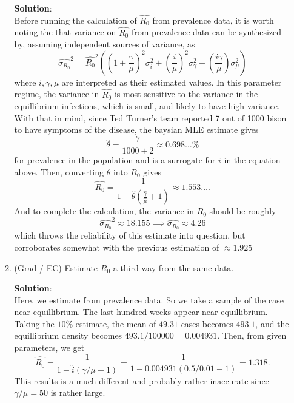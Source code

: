 \documentclass[11pt]{article}
\begin{document}
\begin{enumerate}
\begin{enumerate}[label=\alph*.]
	\begin{tcolorbox}[breakable]
	\textbf{Solution}:\\
	Before running the calculation of $\hat{R_0}$ from prevalence data, it is worth noting the that variance on $\hat{R_0}$ from prevalence data can be synthesized by, assuming independent sources of variance, as
	\begin{equation*}
		\hat{\sigma_{R_0}}^2 = \hat{R_0}^2\left((1+\frac{\gamma}{\mu})^2\sigma_{i}^2 + (\frac{i}{\mu})^2\sigma_{\gamma}^2+(\frac{i\gamma}{\mu})\sigma_{\mu}^2\right)
	\end{equation*}
	where $i, \gamma, \mu$ are interpreted as their estimated values. In this parameter regime, the variance in $\hat{R_0}$ is most sensitive to the variance in the equillibrium infections, which is small, and likely to have high variance. With that in mind, since Ted Turner's team reported 7 out of 1000 bison to have symptoms of the disease, the baysian MLE estimate gives
	\begin{equation*}
		\hat{\theta}=\frac{7}{1000+2}\approx 0.698\ldots\%
	\end{equation*}
	for prevalence in the population and is a surrogate for $i$ in the equation above. Then, converting $\theta$ into $R_0$ gives
	\begin{equation*}
		\hat{R_0}=\frac{1}{1-\hat{\theta}\left(\frac{\hat{\gamma}}{\hat{\mu}}+1\right)}\approx 1.553\ldots.
	\end{equation*}
	And to complete the calculation, the variance in $R_0$ should be roughly
	\begin{equation*}
		\widehat{\sigma_{R_0}}^2 \approx 18.155 \implies \widehat{\sigma_{R_0}} \approx 4.26
	\end{equation*}
	which throws the reliability of this estimate into question, but corroborates somewhat with the previous estimation of $\approx 1.925$
	\end{tcolorbox}
	
	\item (Grad / EC) Estimate $R_0$ a third way from the same data. 
	
	\begin{tcolorbox}[breakable]
	\textbf{Solution}:\\
		Here, we estimate from prevalence data. So we take a sample of the case near equillibrium. The last hundred weeks appear near equillibrium. Taking the $10\%$ estimate, the mean of $49.31$ cases becomes $493.1$, and the equillibrium density becomes $493.1/100000=0.004931$. Then, from given parameters, we get
		\begin{equation*}
			\hat{R_0}=\frac{1}{1-\hat{i}(\gamma/\mu-1)}=\frac{1}{1-0.004931(0.5/0.01-1)}=1.318.
		\end{equation*}
		This results is a much different and probably rather inaccurate since $\gamma/\mu=50$ is rather large. 
	\end{tcolorbox}
	

\end{enumerate}
\end{enumerate}
\end{document}
